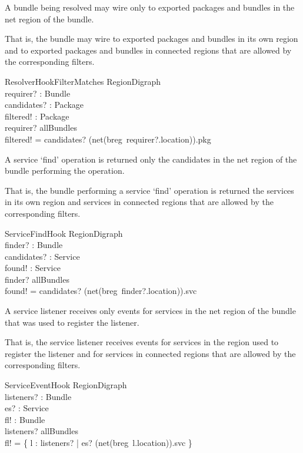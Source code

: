 \documentclass[a4paper,9pt]{article}
\begin{document}
A bundle being resolved may wire only to exported packages and bundles in the net region of the
bundle.

That is, the bundle may wire to exported packages and bundles in its own region and to
exported packages and bundles in connected regions that are allowed by the corresponding filters.
\begin{schema}{ResolverHookFilterMatches}
  \Xi RegionDigraph \\
  requirer? : Bundle \\
  candidates? : \power Package \\
  filtered! : \power Package \\
\where
  requirer? \in allBundles \\
  filtered! = candidates? \cap (net(breg~requirer?.location)).pkg \\
\end{schema}

A service `find' operation is returned only the
candidates in the net region of the bundle performing the operation.

That is, the bundle performing a service `find' operation is returned the services in its own region
and services in connected regions that are allowed by the corresponding filters.
\begin{schema}{ServiceFindHook}
  \Xi RegionDigraph \\
  finder? : Bundle \\
  candidates? : \power Service \\
  found! : \power Service \\
\where
  finder? \in allBundles \\
  found! = candidates? \cap (net(breg~finder?.location)).svc \\
\end{schema}

A service listener receives only events for services in the net region of the bundle that was used
to register the listener.

That is, the service listener receives events for services in the region used to register the listener
and for services in connected regions that are allowed by the corresponding filters.
\begin{schema}{ServiceEventHook}
  \Xi RegionDigraph \\
  listeners? : \power Bundle \\
  es? : Service \\
  fl! : \power Bundle \\
\where
  listeners? \subseteq allBundles \\
  fl! = \{ l : listeners? | es? \in (net(breg~l.location)).svc \} \\
\end{schema}
\end{document}
